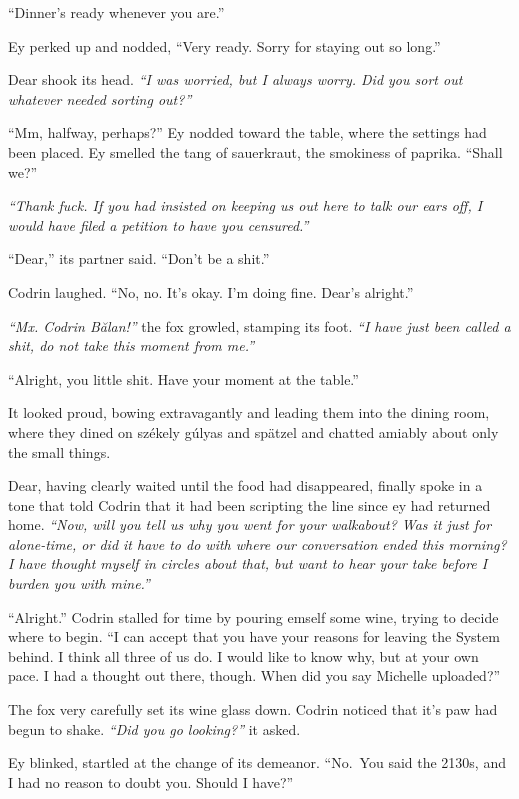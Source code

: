 ``Dinner's ready whenever you are.''

Ey perked up and nodded, ``Very ready. Sorry for staying out so long.''

Dear shook its head. \emph{``I was worried, but I always worry. Did you sort out whatever needed sorting out?''}

``Mm, halfway, perhaps?'' Ey nodded toward the table, where the settings had been placed. Ey smelled the tang of sauerkraut, the smokiness of paprika. ``Shall we?''

\emph{``Thank fuck. If you had insisted on keeping us out here to talk our ears off, I would have filed a petition to have you censured.''}

``Dear,'' its partner said. ``Don't be a shit.''

Codrin laughed. ``No, no. It's okay. I'm doing fine. Dear's alright.''

\emph{``Mx. Codrin Bălan!''} the fox growled, stamping its foot. \emph{``I have just been called a shit, do not take this moment from me.''}

``Alright, you little shit. Have your moment at the table.''

It looked proud, bowing extravagantly and leading them into the dining room, where they dined on székely gúlyas and spätzel and chatted amiably about only the small things.

Dear, having clearly waited until the food had disappeared, finally spoke in a tone that told Codrin that it had been scripting the line since ey had returned home. \emph{``Now, will you tell us why you went for your walkabout? Was it just for alone-time, or did it have to do with where our conversation ended this morning? I have thought myself in circles about that, but want to hear your take before I burden you with mine.''}

``Alright.'' Codrin stalled for time by pouring emself some wine, trying to decide where to begin. ``I can accept that you have your reasons for leaving the System behind. I think all three of us do. I would like to know why, but at your own pace. I had a thought out there, though. When did you say Michelle uploaded?''

The fox very carefully set its wine glass down. Codrin noticed that it's paw had begun to shake. \emph{``Did you go looking?''} it asked.

Ey blinked, startled at the change of its demeanor. ``No.~You said the 2130s, and I had no reason to doubt you. Should I have?''

